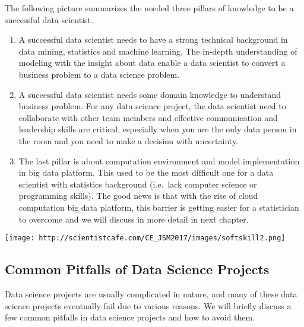 \documentclass[
]{article}
\begin{document}
The following picture summarizes the needed three pillars of knowledge
to be a successful data scientist.

\begin{enumerate}
\def\labelenumi{(\arabic{enumi})}
\item
  A successful data scientist needs to have a strong technical
  background in data mining, statistics and machine learning. The
  in-depth understanding of modeling with the insight about data enable
  a data scientist to convert a business problem to a data science
  problem.
\item
  A successful data scientist needs some domain knowledge to understand
  business problem. For any data science project, the data scientist
  need to collaborate with other team members and effective
  communication and leadership skills are critical, especially when you
  are the only data person in the room and you need to make a decision
  with uncertainty.
\item
  The last pillar is about computation environment and model
  implementation in big data platform. This used to be the most
  difficult one for a data scientist with statistics background
  (i.e.~lack computer science or programming skills). The good news is
  that with the rise of cloud computation big data platform, this
  barrier is getting easier for a statistician to overcome and we will
  discuss in more detail in next chapter.
\end{enumerate}

\texttt{[image: http://scientistcafe.com/CE\_JSM2017/images/softskill2.png]}

\hypertarget{common-pitfalls-of-data-science-projects}{%
\subsection{Common Pitfalls of Data Science
Projects}\label{common-pitfalls-of-data-science-projects}}

Data science projects are usually complicated in nature, and many of
these data science projects eventually fail due to various reasons. We
will briefly discuss a few common pitfalls in data science projects and
how to avoid them.
\end{document}

